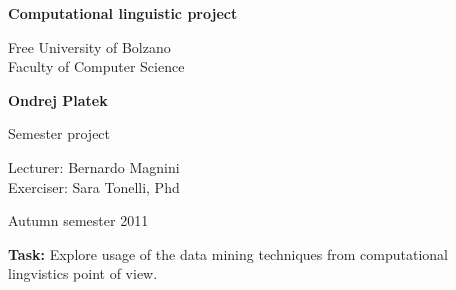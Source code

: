 \begin{titlepage}
\begin{center}

\vspace{45mm}
{\Large\bf Computational linguistic project}
\vspace{20mm}

\large
Free University of Bolzano\\
Faculty of Computer Science\\
\vspace{30mm}

{\Large\bf Ondrej Platek }\\ 
\vspace{30mm}

{\Large Semester project}
\vspace{10mm}

Lecturer: Bernardo Magnini \\
Exerciser: Sara Tonelli, Phd\\
\vspace{30mm}

Autumn semester 2011
\end{center}

\vspace{50mm}

\noindent 
{\bf Task:}
Explore usage of the data mining techniques from computational lingvistics point of view.
\end{titlepage} %

